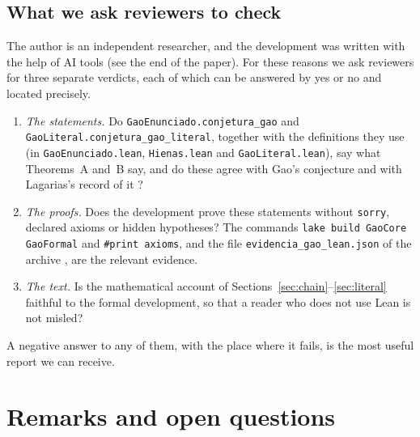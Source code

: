 \documentclass[11pt]{amsart}
\theoremstyle{definition}
\theoremstyle{remark}
\newcommand{\lean}[1]{\nolinkurl{#1}}
\begin{document}
\subsection{What we ask reviewers to check}\label{sec:ask}
The author is an independent researcher, and the development was written with the help of AI tools (see the end of the paper). For these reasons we ask reviewers for three separate verdicts, each of which can be answered by yes or no and located precisely.
\begin{enumerate}
\item \emph{The statements.} Do \lean{GaoEnunciado.conjetura_gao} and \lean{GaoLiteral.conjetura_gao_literal}, together with the definitions they use (in \lean{GaoEnunciado.lean}, \lean{Hienas.lean} and \lean{GaoLiteral.lean}), say what Theorems~A and~B say, and do these agree with Gao's conjecture \cite{Gao93} and with Lagarias's record of it \cite{Lag03}?
\item \emph{The proofs.} Does the development prove these statements without \texttt{sorry}, declared axioms or hidden hypotheses? The commands \texttt{lake build GaoCore GaoFormal} and \texttt{\#print axioms}, and the file \texttt{evidencia\_gao\_lean.json} of the archive \cite{Artifact}, are the relevant evidence.
\item \emph{The text.} Is the mathematical account of Sections~\ref{sec:chain}--\ref{sec:literal} faithful to the formal development, so that a reader who does not use Lean is not misled?
\end{enumerate}
A negative answer to any of them, with the place where it fails, is the most useful report we can receive.

\section{Remarks and open questions}\label{sec:remarks}
\end{document}
